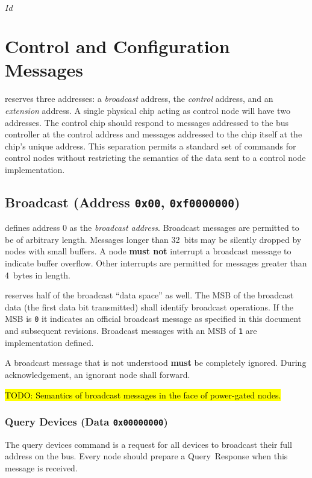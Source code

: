 \svnInfo $Id$

\section{Control and Configuration Messages}
\label{sec:control}

\bus reserves three addresses: a {\em broadcast} address, the {\em control}
address, and an {\em extension} address. A single physical chip acting as
control node will have two addresses. The control chip should respond to
messages addressed to the bus controller at the control address and messages
addressed to the chip itself at the chip's unique address. This separation
permits a standard set of commands for \bus control nodes without restricting
the semantics of the data sent to a control node implementation.

\subsection{Broadcast (Address \texttt{0x00}, \texttt{0xf0000000})}
\label{sec:control-broadcast}
\bus defines address 0 as the \textit{broadcast address}. Broadcast messages
are permitted to be of arbitrary length. Messages longer than 32~bits may be
silently dropped by nodes with small buffers. A node \textbf{must not}
interrupt a broadcast message to indicate buffer overflow. Other interrupts
are permitted for messages greater than 4~bytes in length.

\bus reserves half of the broadcast ``data space'' as well. The MSB of the
broadcast data (the first data bit transmitted) shall identify \bus broadcast
operations. If the MSB is {\tt 0} it indicates an official \bus broadcast
message as specified in this document and subsequent revisions. Broadcast
messages with an MSB of {\tt 1} are implementation defined.

A broadcast message that is not understood \textbf{must} be completely
ignored. During acknowledgement, an ignorant node shall forward.

\hl{TODO: Semantics of broadcast messages in the face of power-gated nodes.}


\subsubsection{Query Devices (Data \texttt{0x00000000})}
The query devices command is a request for all devices to broadcast their full
address on the bus. Every \bus node should prepare a Query~Response when this
message is received.

